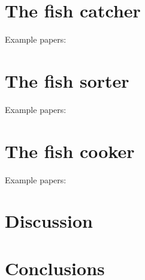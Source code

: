 \documentclass[conference]{IEEEtran}
\begin{document}
\section{The fish catcher}
Example papers:


\section{The fish sorter}
Example papers: \cite{b1} \cite{b2} \cite{b3} \cite{b5} \cite{b6}


\section{The fish cooker}
Example papers:

\section{Discussion}

\section{Conclusions}
\end{document}
